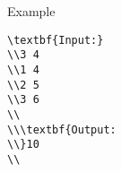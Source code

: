 Example
\begin{verbatim}
\textbf{Input:}
\\3 4
\\1 4
\\2 5
\\3 6
\\
\\\textbf{Output:
\\}10
\\\end{verbatim}